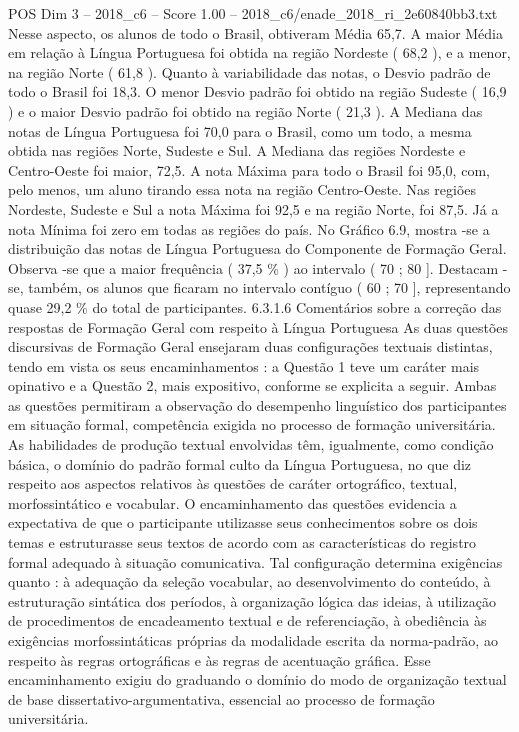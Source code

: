 \begin{textsample}{POS Dim 3 – 2018\_c6 – Score 1.00 – 2018\_c6/enade\_2018\_ri\_2e60840bb3.txt}
Nesse aspecto, os alunos de todo o Brasil, obtiveram Média 65,7.
A maior Média em relação à Língua Portuguesa foi obtida na região Nordeste ( 68,2 ), e a menor, na região Norte ( 61,8 ).
Quanto à variabilidade das notas, o Desvio padrão de todo o Brasil foi 18,3.
O menor Desvio padrão foi obtido na região Sudeste ( 16,9 ) e o maior Desvio padrão foi obtido na região Norte ( 21,3 ).
A Mediana das notas de Língua Portuguesa foi 70,0 para o Brasil, como um todo, a mesma obtida nas regiões Norte, Sudeste e Sul.
A Mediana das regiões Nordeste e Centro-Oeste foi maior, 72,5.
A nota Máxima para todo o Brasil foi 95,0, com, pelo menos, um aluno tirando essa nota na região Centro-Oeste.
Nas regiões Nordeste, Sudeste e Sul a nota Máxima foi 92,5 e na região Norte, foi 87,5.
Já a nota Mínima foi zero em todas as regiões do país.
No Gráfico 6.9, mostra -se a distribuição das notas de Língua Portuguesa do Componente de Formação Geral.
Observa -se que a maior frequência ( 37,5 \% ) ao intervalo ( 70 ; 80 ].
Destacam -se, também, os alunos que ficaram no intervalo contíguo ( 60 ; 70 ], representando quase 29,2 \% do total de participantes. 6.3.1.6 Comentários sobre a correção das respostas de Formação Geral com respeito à Língua Portuguesa As duas questões discursivas de Formação Geral ensejaram duas configurações textuais distintas, tendo em vista os seus encaminhamentos : a Questão 1 teve um caráter mais opinativo e a Questão 2, mais expositivo, conforme se explicita a seguir.
Ambas as questões permitiram a observação do desempenho linguístico dos participantes em situação formal, competência exigida no processo de formação universitária.
As habilidades de produção textual envolvidas têm, igualmente, como condição básica, o domínio do padrão formal culto da Língua Portuguesa, no que diz respeito aos aspectos relativos às questões de caráter ortográfico, textual, morfossintático e vocabular.
O encaminhamento das questões evidencia a expectativa de que o participante utilizasse seus conhecimentos sobre os dois temas e estruturasse seus textos de acordo com as características do registro formal adequado à situação comunicativa.
Tal configuração determina exigências quanto : à adequação da seleção vocabular, ao desenvolvimento do conteúdo, à estruturação sintática dos períodos, à organização lógica das ideias, à utilização de procedimentos de encadeamento textual e de referenciação, à obediência às exigências morfossintáticas próprias da modalidade escrita da norma-padrão, ao respeito às regras ortográficas e às regras de acentuação gráfica.
Esse encaminhamento exigiu do graduando o domínio do modo de organização textual de base dissertativo-argumentativa, essencial ao processo de formação universitária.

\end{textsample}
